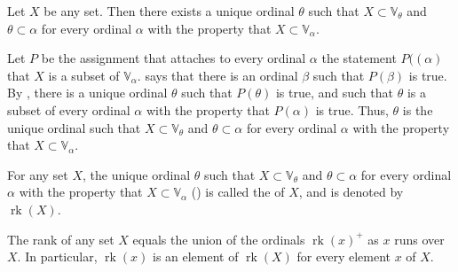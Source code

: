 \documentclass{article}
\begin{document}
\begin{theorem}
  \label{thm:l7vz19h3}
  Let \(X\) be any set.  Then there exists a unique ordinal \(\theta\)
  such that \(X \subset \mathbb{V}_\theta\) and
  \(\theta \subset \alpha\) for every ordinal \(\alpha\) with the
  property that \(X \subset \mathbb{V}_\alpha\).
\end{theorem}

Let \(P\) be the assignment that attaches to every ordinal \(\alpha\)
the statement \(P((\alpha)\) that \(X\) is a subset of
\(\mathbb{V}_\alpha\).   says that there is an
ordinal \(\beta\) such that \(P(\beta)\) is true.  By
, there is a unique ordinal \(\theta\) such that
\(P(\theta)\) is true, and such that \(\theta\) is a subset of every
ordinal \(\alpha\) with the property that \(P(\alpha)\) is true.
Thus, \(\theta\) is the unique ordinal such that
\(X \subset \mathbb{V}_\theta\) and \(\theta \subset \alpha\) for
every ordinal \(\alpha\) with the property that
\(X \subset \mathbb{V}_\alpha\).

For any set \(X\), the unique ordinal \(\theta\) such that
\(X \subset \mathbb{V}_\theta\) and \(\theta \subset \alpha\) for
every ordinal \(\alpha\) with the property that
\(X \subset \mathbb{V}_\alpha\) () is called the
 of \(X\), and is denoted by \(\operatorname{rk}(X)\).

\begin{theorem}
  \label{thm:ok93sv3f}
  The rank of any set \(X\) equals the union of the ordinals
  \(\operatorname{rk}(x)^+\) as \(x\) runs over \(X\).  In particular,
  \(\operatorname{rk}(x)\) is an element of \(\operatorname{rk}(X)\)
  for every element \(x\) of \(X\).
\end{theorem}
\end{document}

